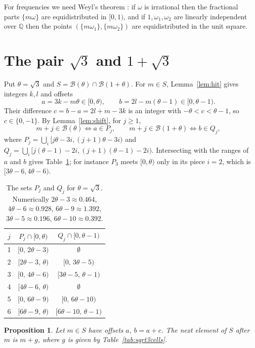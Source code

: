 \documentclass[12pt]{article}
\newcommand{\B}{\mathcal{B}}
\newcommand{\Q}{\mathbb{Q}}
\theoremstyle{plain}
\newtheorem{proposition}[theorem]{Proposition}
\theoremstyle{remark}
\begin{document}
For frequencies we need Weyl's theorem \cite{weyl,kn}: if $\omega$ is irrational then the
fractional parts $\{m\omega\}$ are equidistributed in $[0,1)$, and if $1,\omega_1,\omega_2$ are
linearly independent over $\Q$ then the points $(\{m\omega_1\},\{m\omega_2\})$ are
equidistributed in the unit square.

\section{The pair \texorpdfstring{$\sqrt3$}{sqrt 3} and \texorpdfstring{$1+\sqrt3$}{1 + sqrt 3}}\label{sec:sqrt3}

Put $\theta=\sqrt3$ and $S=\B(\theta)\cap\B(1+\theta)$. For $m\in S$, Lemma~\ref{lem:hit} gives
integers $k,l$ and offsets
\[
a=3k-m\theta\in[0,\theta),\qquad b=2l-m(\theta-1)\in[0,\theta-1).
\]
Their difference $c=b-a=2l+m-3k$ is an integer with $-\theta<c<\theta-1$, so $c\in\{0,-1\}$.
By Lemma~\ref{lem:shift}, for $j\ge1$,
\[
m+j\in\B(\theta)\iff a\in P_j,\qquad m+j\in\B(1+\theta)\iff b\in Q_j,
\]
where $P_j=\bigcup_i[j\theta-3i,(j+1)\theta-3i)$ and
$Q_j=\bigcup_i[j(\theta-1)-2i,(j+1)(\theta-1)-2i)$. Intersecting with the ranges of $a$ and $b$
gives Table~\ref{tab:sqrt3PQ}; for instance $P_3$ meets $[0,\theta)$ only in its piece $i=2$,
which is $[3\theta-6,4\theta-6)$.

\begin{table}[ht]
\centering
\begin{tabular}{ccc}
\toprule
$j$ & $P_j\cap[0,\theta)$ & $Q_j\cap[0,\theta-1)$\\
\midrule
1 & $[0,\,2\theta-3)$ & $\emptyset$\\
2 & $[2\theta-3,\,\theta)$ & $[0,\,3\theta-5)$\\
3 & $[0,\,4\theta-6)$ & $[3\theta-5,\,\theta-1)$\\
4 & $[4\theta-6,\,\theta)$ & $\emptyset$\\
5 & $[0,\,6\theta-9)$ & $[0,\,6\theta-10)$\\
6 & $[6\theta-9,\,\theta)$ & $[6\theta-10,\,\theta-1)$\\
\bottomrule
\end{tabular}
\caption{The sets $P_j$ and $Q_j$ for $\theta=\sqrt3$. Numerically $2\theta-3\approx0.464$,
$4\theta-6\approx0.928$, $6\theta-9\approx1.392$, $3\theta-5\approx0.196$,
$6\theta-10\approx0.392$.}\label{tab:sqrt3PQ}
\end{table}

\begin{proposition}\label{prop:sqrt3cells}
Let $m\in S$ have offsets $a$, $b=a+c$. The next element of $S$ after $m$ is $m+g$, where $g$ is
given by Table~\ref{tab:sqrt3cells}.
\end{proposition}
\end{document}
